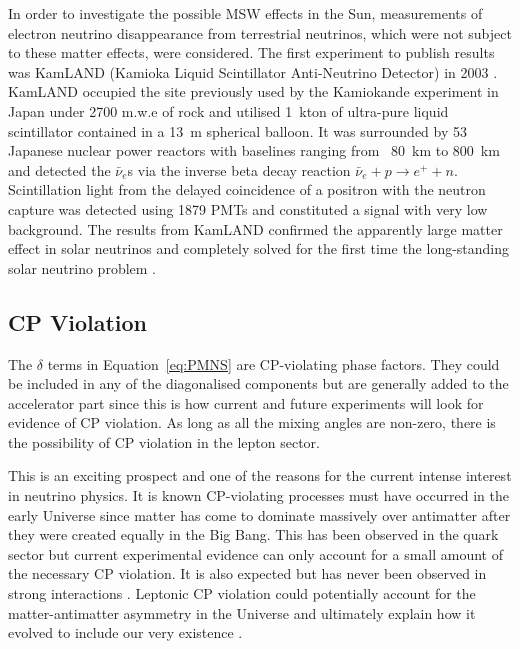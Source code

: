 In order to investigate the possible MSW effects in the Sun, measurements of electron neutrino disappearance from terrestrial neutrinos, which were not subject to these matter effects, were considered.  The first experiment to publish results was KamLAND (Kamioka Liquid Scintillator Anti-Neutrino Detector) in 2003 \cite{KamLAND2003,KamLAND2005}.  KamLAND occupied the site previously used by the Kamiokande experiment in Japan under 2700 m.w.e of rock and utilised 1~kton of ultra-pure liquid scintillator contained in a 13~m spherical balloon.  It was surrounded by 53 Japanese nuclear power reactors with baselines ranging from ~80~km to 800~km and detected the $\bar{\nu}_e$s via the inverse beta decay reaction $\bar{\nu}_e + p \rightarrow e^+ + n$.  Scintillation light from the delayed coincidence of a positron with the neutron capture was detected using 1879 PMTs and constituted a signal with very low background.  The results from KamLAND confirmed the apparently large matter effect in solar neutrinos and completely solved for the first time the long-standing solar neutrino problem \cite{Bandyopadhyay2002,deHolanda2002,Fogli2003}.

\subsection{CP Violation}\label{sec:CPViolation}

The $\delta$ terms in Equation~\ref{eq:PMNS} are CP-violating phase factors.  They could be included in any of the diagonalised components but are generally added to the accelerator part since this is how current and future experiments will look for evidence of CP violation.  As long as all the mixing angles are non-zero, there is the possibility of CP violation in the lepton sector.

This is an exciting prospect and one of the reasons for the current intense interest in neutrino physics.  It is known CP-violating processes must have occurred in the early Universe since matter has come to dominate massively over antimatter after they were created equally in the Big Bang.  This has been observed in the quark sector but current experimental evidence can only account for a small amount of the necessary CP violation.  It is also expected but has never been observed in strong interactions \cite{Mannel2007}.  Leptonic CP violation could potentially account for the matter-antimatter asymmetry in the Universe and ultimately explain how it evolved to include our very existence \cite{Ohlsson2012,Ohlsson2013}.

